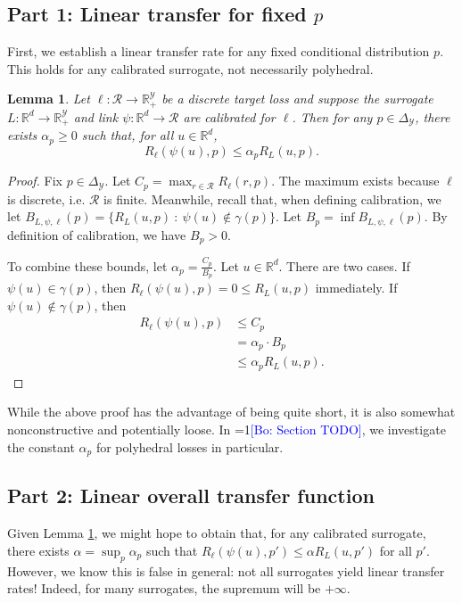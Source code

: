 \documentclass{article}
\newtheorem{lemma}{Lemma}
\newcommand{\Comments}{1}
\newcommand{\mynote}[2]{\ifnum\Comments=1\textcolor{#1}{#2}\fi}
\newcommand{\bo}[1]{\mynote{blue}{[Bo: #1]}}
\newcommand{\reals}{\mathbb{R}}
\newcommand{\simplex}{\Delta_\Y}
\newcommand{\R}{\mathcal{R}}
\newcommand{\Y}{\mathcal{Y}}
\begin{document}
\subsection{Part 1: Linear transfer for fixed $p$}
First, we establish a linear transfer rate for any fixed conditional distribution $p$.
This holds for any calibrated surrogate, not necessarily polyhedral.
\begin{lemma} \label{lemma:fixed-p}
  Let $\ell: \R \to \reals_+^{\Y}$ be a discrete target loss and suppose the surrogate $L: \reals^d \to \reals_+^{\Y}$ and link $\psi: \reals^d \to \R$ are calibrated for $\ell$.
  Then for any $p \in \simplex$, there exists $\alpha_p \geq 0$ such that, for all $u \in \reals^d$,
    \[ R_{\ell}(\psi(u),p) \leq \alpha_p R_L(u,p) . \]
\end{lemma}
\begin{proof}
  Fix $p \in \simplex$.
  Let $C_p = \max_{r \in \R} R_{\ell}(r,p)$.
  The maximum exists because $\ell$ is discrete, i.e. $\R$ is finite.
  Meanwhile, recall that, when defining calibration, we let $B_{L,\psi,\ell}(p) = \{R_L(u,p) ~:~ \psi(u) \not\in \gamma(p)\}$.
  Let $B_p = \inf B_{L,\psi,\ell}(p)$.
  By definition of calibration, we have $B_p > 0$.

  To combine these bounds, let $\alpha_p = \frac{C_p}{B_p}$.
  Let $u \in \reals^d$.
  There are two cases.
  If $\psi(u) \in \gamma(p)$, then $R_{\ell}(\psi(u),p) = 0 \leq R_L(u,p)$ immediately.
  If $\psi(u) \not\in \gamma(p)$, then
  \begin{align*}
    R_{\ell}(\psi(u),p)
    &\leq C_p \\
    &=    \alpha_p \cdot B_p  \\
    &\leq \alpha_p R_L(u,p) .
  \end{align*}
\end{proof}
While the above proof has the advantage of being quite short, it is also somewhat nonconstructive and potentially loose.
In \bo{Section TODO}, we investigate the constant $\alpha_p$ for polyhedral losses in particular.

\subsection{Part 2: Linear overall transfer function}
Given Lemma \ref{lemma:fixed-p}, we might hope to obtain that, for any calibrated surrogate, there exists $\alpha = \sup_p \alpha_p$ such that $R_{\ell}(\psi(u),p') \leq \alpha R_L(u,p')$ for all $p'$.
However, we know this is false in general: not all surrogates yield linear transfer rates!
Indeed, for many surrogates, the supremum will be $+\infty$.
\end{document}
